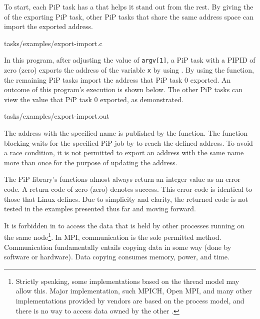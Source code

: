 To start, each PiP task has a {\PIPID} that helps it stand out from the
rest. By giving the {\PIPID} of the exporting PiP task, other PiP tasks
that share the same address space can import the exported address.

 {tasks/examples/export-import.c}

In this program, after adjusting the value of {\tt argv[1]}, a PiP
task with a PIPID of zero (zero) exports the address of the variable
{\tt x} by using . By using the
 function, the 
remaining PiP tasks import the address that PiP task 0 exported. An
outcome of this program's execution is shown below. The other PiP
tasks can view the value that PiP task 0 exported, as demonstrated.

 {tasks/examples/export-import.out}

The address with the specified name is published by the
 function. The
 function blocking-waits for the specified
PiP job by {\PIPID} to reach the defined address. To avoid a race condition,
it is not permitted to export an address with the same name more than
once for the purpose of updating the address.

The PiP library's functions almost always return an integer value as
an error code. A return code of zero (zero) denotes success. This
error code is identical to those that Linux defines. Due to simplicity
and clarity, the returned code is not tested in the examples presented
thus far and moving forward.  

It is forbidden in  to access the data that is held by other
processes running on the same node\footnote{Strictly speaking, some
   implementations based on the thread model may allow
  this. Major  implementation, such MPICH, 
Open MPI, and many other  implementations provided by vendors are
based on the process model, and there is no way to access data owned by
the other .}. In MPI, communication is the sole 
permitted method. Communication fundamentally entails copying data in
some way (done by software or hardware). Data copying consumes memory,
power, and time.

